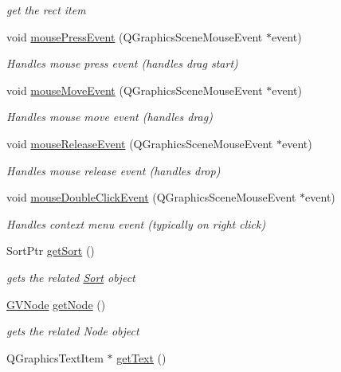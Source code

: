 \begin{DoxyCompactItemize}
\begin{DoxyCompactList}\small\item\em get the rect item \end{DoxyCompactList}\item 
void \hyperlink{classGSort_ac3cbef2a811660668cff937f56ca37fe}{mouse\+Press\+Event} (Q\+Graphics\+Scene\+Mouse\+Event $\ast$event)
\begin{DoxyCompactList}\small\item\em Handles mouse press event (handles drag start) \end{DoxyCompactList}\item 
void \hyperlink{classGSort_aad29bd2ba170cd9b89ca80edf3439367}{mouse\+Move\+Event} (Q\+Graphics\+Scene\+Mouse\+Event $\ast$event)
\begin{DoxyCompactList}\small\item\em Handles mouse move event (handles drag) \end{DoxyCompactList}\item 
void \hyperlink{classGSort_a340c92716c90ad010232fdd972902ff0}{mouse\+Release\+Event} (Q\+Graphics\+Scene\+Mouse\+Event $\ast$event)
\begin{DoxyCompactList}\small\item\em Handles mouse release event (handles drop) \end{DoxyCompactList}\item 
void \hyperlink{classGSort_ad91eafb0a2ef415cb9b3f47f9c608da7}{mouse\+Double\+Click\+Event} (Q\+Graphics\+Scene\+Mouse\+Event $\ast$event)
\begin{DoxyCompactList}\small\item\em Handles context menu event (typically on right click) \end{DoxyCompactList}\item 
Sort\+Ptr \hyperlink{classGSort_a69520d78ab078c083b8090f9190424b0}{get\+Sort} ()
\begin{DoxyCompactList}\small\item\em gets the related \hyperlink{classSort}{Sort} object \end{DoxyCompactList}\item 
\hyperlink{structGVNode}{G\+V\+Node} \hyperlink{classGSort_a48ceb7cdbb0392344873fd88395675c4}{get\+Node} ()
\begin{DoxyCompactList}\small\item\em gets the related Node object \end{DoxyCompactList}\item 
\hypertarget{classGSort_a50bd1249aaf2833987b66d950bcc86f6}{Q\+Graphics\+Text\+Item $\ast$ \hyperlink{classGSort_a50bd1249aaf2833987b66d950bcc86f6}{get\+Text} ()}\label{classGSort_a50bd1249aaf2833987b66d950bcc86f6}


\end{DoxyCompactItemize}
